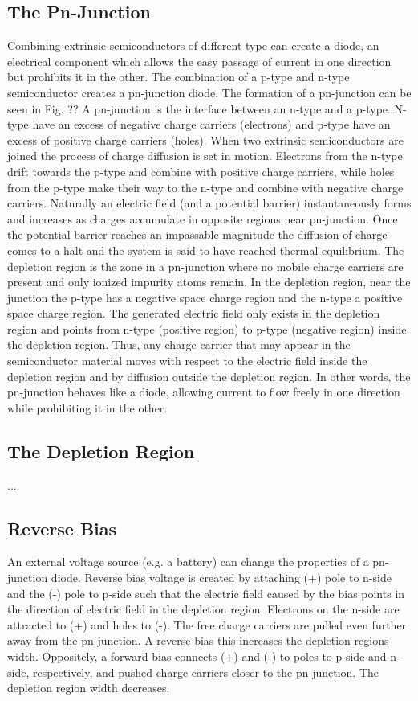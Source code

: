 \subsection{The Pn-Junction}%
Combining extrinsic semiconductors of different type can create a diode, an electrical component which allows the easy passage of current in one direction but prohibits it in the other. The combination of a p-type and n-type semiconductor creates a pn-junction diode. The formation of a pn-junction can be seen in Fig. ??
A pn-junction is the interface between an n-type and a p-type. N-type have an excess of negative charge carriers (electrons) and p-type have an excess of positive charge carriers (holes). When two extrinsic semiconductors are joined the process of charge diffusion is set in motion. Electrons from the n-type drift towards the p-type and combine with positive charge carriers, while holes from the p-type make their way to the n-type and combine with negative charge carriers. Naturally an electric field (and a potential barrier) instantaneously forms and increases as charges accumulate in opposite regions near pn-junction. Once the potential barrier reaches an impassable magnitude the diffusion of charge comes to a halt and the system is said to have reached thermal equilibrium. The depletion region is the zone in a pn-junction where no mobile charge carriers are present and only ionized impurity atoms remain. In the depletion region, near the junction the p-type has a negative space charge region and the n-type a positive space charge region. The generated electric field only exists in the depletion region and points from n-type (positive region) to p-type (negative region) inside the depletion region. Thus, any charge carrier that may appear in the semiconductor material moves with respect to the electric field inside the depletion region and by diffusion outside the depletion region. In other words, the pn-junction behaves like a diode, allowing current to flow freely in one direction while prohibiting it in the other.

\subsection{The Depletion Region}
...

\subsection{Reverse Bias} %
An external voltage source (e.g. a battery) can change the properties of a pn-junction diode. Reverse bias voltage is created by attaching (+) pole to n-side and the (-) pole to p-side such that the electric field caused by the bias points in the direction of electric field in the depletion region.  Electrons on the n-side are attracted to (+) and holes to (-). The free charge carriers are pulled even further away from the pn-junction. A reverse bias this increases the depletion regions width.
Oppositely, a forward bias connects (+) and (-) to poles to p-side and n-side, respectively, and pushed charge carriers closer to the pn-junction. The depletion region width decreases.

